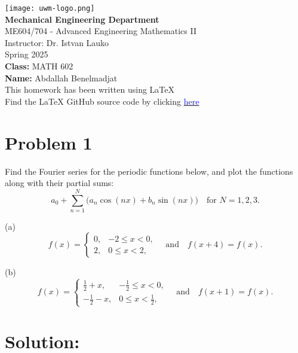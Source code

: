 \documentclass{article}
\date{}
\begin{document}
\begin{titlepage}
    \centering
    \texttt{[image: uwm-logo.png]} \\
    \vspace{1cm}
    {\large \textbf{Mechanical Engineering Department}}\\[0.5em]
    {\large ME604/704 - Advanced Engineering Mathematics II}\\[0.5em]
    {\large Instructor: Dr. Istvan Lauko}\\[0.5em]
    {\large Spring 2025}\\[2cm]
    
    {\large \textbf{Class:} MATH 602}\\[0.5em]
    {\large \textbf{Name:} Abdallah Benelmadjat}\\[0.5em]
    {\large This homework has been written using \LaTeX}\\
    {\large Find the LaTeX GitHub source code by clicking \href{https://github.com/abdallah-benelmadjat/MATH-602/blob/main/HW4.tex}{\textcolor{blue}{here}}}\\

\end{titlepage}

\newpage

\section*{Problem 1}

\noindent
Find the Fourier series for the periodic functions below, and plot the 
functions along with their partial sums:
\[
a_0 + \sum_{n=1}^{N} \bigl(a_n \cos(nx) + b_n \sin(nx)\bigr)
\quad \text{for } N = 1, 2, 3.
\]

\noindent
(a)\quad
\[
f(x) =
\begin{cases}
0, & -2 \le x < 0,\\[6pt]
2, & 0 \le x < 2,
\end{cases}
\quad\text{and}\quad f(x+4) = f(x).
\]

\noindent
(b)\quad
\[
f(x) =
\begin{cases}
\tfrac{1}{2} + x, & -\tfrac{1}{2} \le x < 0,\\[6pt]
-\tfrac{1}{2} - x, & 0 \le x < \tfrac{1}{2},
\end{cases}
\quad\text{and}\quad f(x+1) = f(x).
\]

\section*{Solution:}
\end{document}

